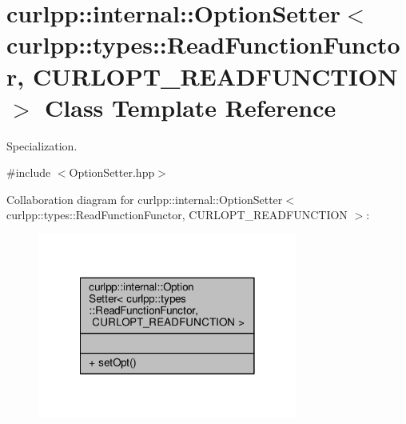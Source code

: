 \hypertarget{classcurlpp_1_1internal_1_1OptionSetter_3_01curlpp_1_1types_1_1ReadFunctionFunctor_00_01CURLOPT__READFUNCTION_01_4}{\section{curlpp\-:\-:internal\-:\-:Option\-Setter$<$ curlpp\-:\-:types\-:\-:Read\-Function\-Functor, C\-U\-R\-L\-O\-P\-T\-\_\-\-R\-E\-A\-D\-F\-U\-N\-C\-T\-I\-O\-N $>$ Class Template Reference}
\label{classcurlpp_1_1internal_1_1OptionSetter_3_01curlpp_1_1types_1_1ReadFunctionFunctor_00_01CURLOPT__READFUNCTION_01_4}
}


Specialization.  




{\ttfamily \#include $<$Option\-Setter.\-hpp$>$}



Collaboration diagram for curlpp\-:\-:internal\-:\-:Option\-Setter$<$ curlpp\-:\-:types\-:\-:Read\-Function\-Functor, C\-U\-R\-L\-O\-P\-T\-\_\-\-R\-E\-A\-D\-F\-U\-N\-C\-T\-I\-O\-N $>$\-:
\nopagebreak
\begin{figure}[H]
\begin{center}
\leavevmode
\includegraphics[width=242pt]{classcurlpp_1_1internal_1_1OptionSetter_3_01curlpp_1_1types_1_1ReadFunctionFunctor_00_01CURLOPT__READFUNCTION_01_4__coll__graph}
\end{center}
\end{figure}
